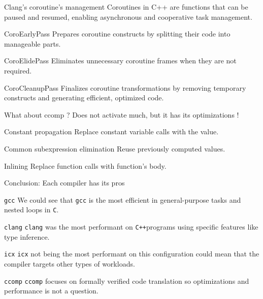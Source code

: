 \documentclass{beamer}
\newcommand{\gcc}{\texttt{gcc} }
\newcommand{\icx}{\texttt{icx} }
\newcommand{\clang}{\texttt{clang} }
\newcommand{\comp}{\texttt{ccomp} }
\newcommand{\clgg}{\texttt{C}}
\newcommand{\cpp}{\texttt{C++}}
\begin{document}
    \begin{frame}[<+->]{Clang's coroutine's management}
        Coroutines in C++ are functions that can be paused and resumed, enabling asynchronous and cooperative task management.
        \begin{block}{CoroEarlyPass}
            Prepares coroutine constructs by splitting their code into manageable parts.
        \end{block}
        \begin{block}{CoroElidePass}
            Eliminates unnecessary coroutine frames when they are not required.
        \end{block}
        \begin{block}{CoroCleanupPass}
            Finalizes coroutine transformations by removing temporary constructs and generating efficient, optimized code.
        \end{block}

    \end{frame}
    
    \begin{frame}[<+->]{What about ccomp ?}
        Does not activate much, but it has its optimizations !
        \begin{block}{Constant propagation}
            Replace constant variable calls with the value.
        \end{block}
        \begin{block}{Common subexpression elimination}
            Reuse previously computed values.
        \end{block}
        \begin{block}{Inlining}
            Replace function calls with function's body.
        \end{block}
    \end{frame}
    
    \begin{frame}{Conclusion: Each compiler has its pros}
        \begin{block}{\gcc}
            We could see that \gcc is the most efficient in general-purpose tasks and nested loops in \clgg.
        \end{block}
        \begin{block}{\clang}
            \clang was the most performant on \cpp programs using specific features like type inference.
        \end{block}
        \begin{block}{\icx}
            \icx not being the most performant on this configuration could mean that the compiler targets other types of workloads.
        \end{block}
        \begin{block}{\comp}
            \comp focuses on formally verified code translation so optimizations and performance is not a question.
        \end{block}
    \end{frame}
\end{document}
